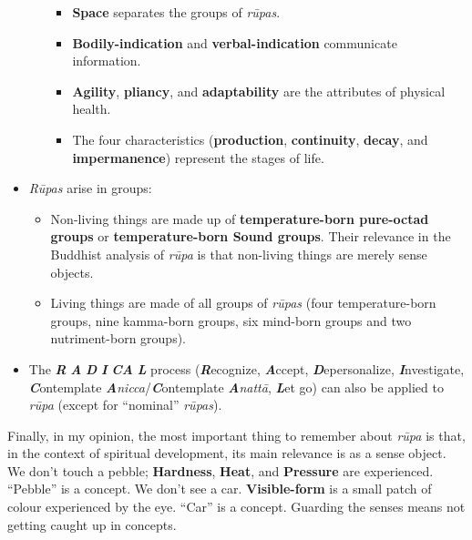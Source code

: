\begin{itemize}
\begin{itemize}
\begin{itemize}

\item \textbf{Space} separates the groups of \textit{rūpas}.

\item \textbf{Bodily-indication} and \textbf{verbal-indication} communicate information.

\item \textbf{Agility}, \textbf{pliancy}, and \textbf{adaptability} are the attributes of physical health.

\item The four characteristics (\textbf{production}, \textbf{continuity}, \textbf{decay}, and \textbf{impermanence}) represent the stages of life.

\end{itemize}

\end{itemize}

\item \textit{Rūpas} arise in groups:

\begin{itemize}

\item Non-living things are made up of \textbf{temperature-born pure-octad groups} or \textbf{temperature-born \textbf{Sound} groups}. Their relevance in the Buddhist analysis of \textit{rūpa} is that non-living things are merely sense objects.

\item Living things are made of all groups of \textit{rūpas} (four temperature-born groups, nine kamma-born groups, six mind-born groups and two nutriment-born groups).

\end{itemize}

\item The \textbf{\textit{R}} \textbf{\textit{A}} \textbf{\textit{D}} \textbf{\textit{I}} \textbf{\textit{CA}} \textbf{\textit{L}} process (\textbf{\textit{R}}ecognize, \textbf{\textit{A}}ccept, \textbf{\textit{D}}epersonalize, \textbf{\textit{I}}nvestigate, \textbf{\textit{C}}ontemplate \textbf{\textit{A}}\textit{nicca}/\textbf{\textit{C}}ontemplate \textbf{\textit{A}}\textit{nattā}, \textbf{\textit{L}}et go) can also be applied to \textit{rūpa} (except for “nominal” \textit{rūpas}).

\end{itemize}

Finally, in my opinion, the most important thing to remember about \textit{rūpa} is that, in the context of spiritual development, its main relevance is as a sense object. We don’t touch a pebble; \textbf{Hardness}, \textbf{Heat}, and \textbf{Pressure} are experienced. “Pebble” is a concept. We don’t see a car. \textbf{Visible-form} is a small patch of colour experienced by the eye. “Car” is a concept. Guarding the senses means not getting caught up in concepts.

